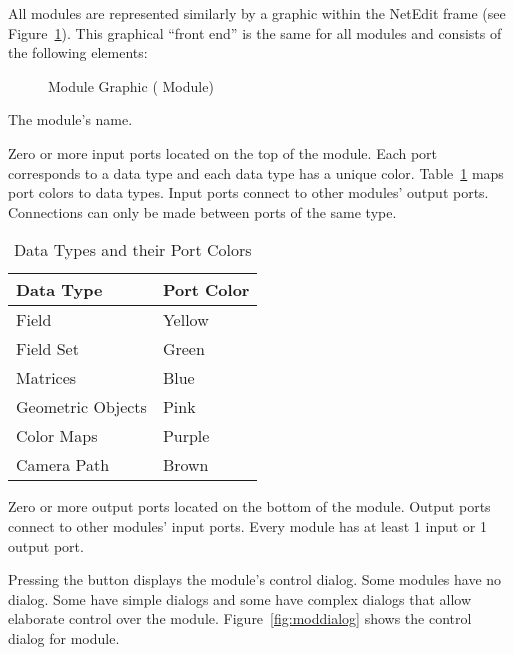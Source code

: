 All modules are represented similarly by a graphic within the NetEdit frame
(see Figure~\ref{fig:modgraphic}). This graphical ``front end'' is the same
for all modules and consists of the following elements:

\begin{figure}[htb]
  \begin{makeimage}
  \end{makeimage}
  \modgraphic
  \caption{\label{fig:modgraphic} Module Graphic ( Module)}
\end{figure}

\begin{description}
   The module's name.
  
   Zero or more input ports located on the top
  of the module.  Each port corresponds to a data type and each data
  type has a unique color.  Table~\ref{tab:portcolors} maps port
  colors to data types.  Input ports connect to other modules' output
  ports.  Connections can only be made between ports of the same type.

  \begin{table}[htbp]
    \begin{center}
      \begin{tabular}{|l|l|}
        \hline
        \textbf{Data Type} & \textbf{Port Color} \\
        \hline
        Field & Yellow \\
        Field Set & Green \\
        Matrices & Blue \\
        Geometric Objects & Pink \\
        Color Maps & Purple \\
        Camera Path & Brown \\
        \hline
      \end{tabular}
      \caption{Data Types and their Port Colors}
      \label{tab:portcolors}
    \end{center}
  \end{table}
  
   Zero or more output ports located on the
  bottom of the module.  Output ports connect to other modules' input
  ports.  Every module has  at least 1 input or 1 output
  port.
  
   Pressing the  button displays the
  module's control dialog. Some modules have no dialog. Some have
  simple dialogs and some have complex dialogs that allow
  elaborate control over the module.  Figure~\ref{fig:moddialog} shows
  the control dialog for  module.
  

\end{description}
